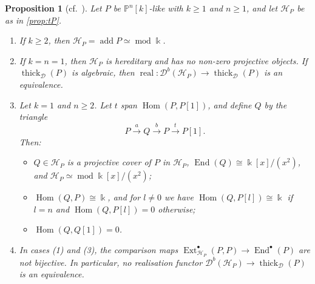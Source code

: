 \documentclass[11pt,reqno]{amsart}
\theoremstyle{plain}
\newtheorem{proposition}[theorem]{Proposition}
\theoremstyle{definition}
\theoremstyle{remark}
\newcommand{\kk}{\Bbbk}
\DeclareMathOperator{\Hom}{Hom}
\DeclareMathOperator{\End}{End}
\DeclareMathOperator{\Ext}{Ext}
\DeclareMathOperator{\add}{add}
\DeclareMathOperator{\real}{real}
\newcommand{\modd}{\operatorname{mod}}
\newcommand{\Db}{\mathcal{D}^b}
\newcommand{\thick}[2][\cD]{\operatorname{thick}_{#1}(#2)}
\newcommand{\Pn}[2]{\mathbb{P}^{#1}[#2]}
\newcommand{\cD}{\mathcal{D}}
\newcommand{\cH}{\mathcal{H}}
\begin{document}
\begin{proposition}[{cf.\ \cite[Lemmas~3.11 and~4.15, Cor.~4.16]{Bonf26}}]\label{prop:heart-P}
Let $P$ be $\Pn nk$-like with $k\ge1$ and $n\ge1$, and let $\cH_P$ be as in \cref{prop:tP}.
\begin{enumerate}
\item If $k\ge2$, then $\cH_P=\add P\simeq\modd\kk$.
\item If $k=n=1$, then $\cH_P$ is hereditary and has no non-zero projective objects. If $\thick P$ is algebraic, then $\real\colon\Db(\cH_P)\to\thick P$ is an equivalence.
\item Let $k=1$ and $n\ge2$. Let $t$ span $\Hom(P,P[1])$, and define $Q$ by the triangle
\[P\xrightarrow{a}Q\xrightarrow{b}P\xrightarrow{t}P[1].\]
Then:
\begin{itemize}
\item $Q\in\cH_P$ is a projective cover of $P$ in $\cH_P$, $\End(Q)\cong\kk[x]/(x^2)$, and $\cH_P\simeq\modd\kk[x]/(x^2)$;
\item $\Hom(Q,P)\cong\kk$, and for $l\ne0$ we have $\Hom(Q,P[l])\cong\kk$ if $l=n$ and $\Hom(Q,P[l])=0$ otherwise;
\item $\Hom(Q,Q[1])=0$.
\end{itemize}
\item In cases \textup{(1)} and \textup{(3)}, the comparison maps $\Ext^\bullet_{\cH_P}(P,P)\to\End^\bullet(P)$ are not bijective. In particular, no realisation functor $\Db(\cH_P)\to\thick P$ is an equivalence.
\end{enumerate}
\end{proposition}
\end{document}
